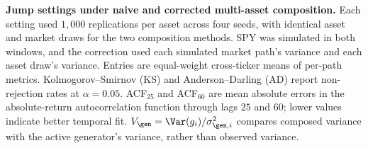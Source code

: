 \begin{table}[H]
  \centering
  \caption{\textbf{Jump settings under naive and corrected multi-asset
    composition.} Each setting used $1{,}000$ replications per asset
    across four seeds, with identical asset and market draws for the
    two composition methods. SPY was simulated in both windows,
    and the correction used each simulated market path's variance
    and each asset draw's variance. Entries are equal-weight
    cross-ticker means of per-path metrics.
    Kolmogorov--Smirnov (KS) and Anderson--Darling (AD) report
    non-rejection rates at $\alpha=0.05$. ACF$_{25}$ and ACF$_{60}$
    are mean absolute errors in the absolute-return autocorrelation
    function through lags $25$ and $60$; lower values indicate better
    temporal fit. $V_{\gen}=\Var(g_i)/\sigma_{\gen,i}^2$ compares
    composed variance with the active generator's variance, rather
    than observed variance.}
  \label{tab:jump_ablation}
  \footnotesize
  \setlength{\tabcolsep}{4pt}
  
\end{table}
